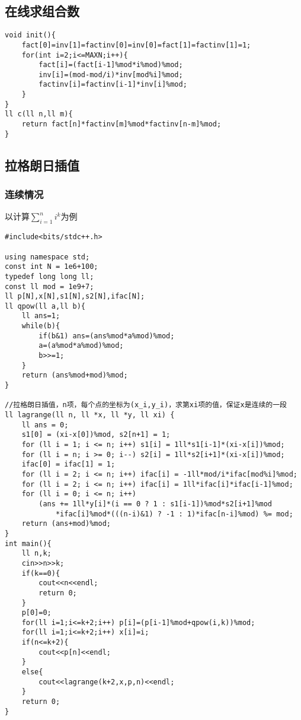 \documentclass[twocolumn,a4]{article}
\begin{document}
\subsection{在线求组合数}
\begin{lstlisting}
void init(){
    fact[0]=inv[1]=factinv[0]=inv[0]=fact[1]=factinv[1]=1;
    for(int i=2;i<=MAXN;i++){
        fact[i]=(fact[i-1]%mod*i%mod)%mod;
        inv[i]=(mod-mod/i)*inv[mod%i]%mod;
        factinv[i]=factinv[i-1]*inv[i]%mod;
    }
}
ll c(ll n,ll m){
    return fact[n]*factinv[m]%mod*factinv[n-m]%mod;
}
\end{lstlisting}
\subsection{拉格朗日插值}
\subsubsection{连续情况}
以计算$\sum_{i=1}^{n}{i^k}$为例
\begin{lstlisting}
#include<bits/stdc++.h>

using namespace std;
const int N = 1e6+100;
typedef long long ll;
const ll mod = 1e9+7;
ll p[N],x[N],s1[N],s2[N],ifac[N];
ll qpow(ll a,ll b){
	ll ans=1;
	while(b){
		if(b&1) ans=(ans%mod*a%mod)%mod;
		a=(a%mod*a%mod)%mod;
		b>>=1;
	}
	return (ans%mod+mod)%mod;
}

//拉格朗日插值，n项，每个点的坐标为(x_i,y_i)，求第xi项的值，保证x是连续的一段 
ll lagrange(ll n, ll *x, ll *y, ll xi) {
    ll ans = 0;
    s1[0] = (xi-x[0])%mod, s2[n+1] = 1;
    for (ll i = 1; i <= n; i++) s1[i] = 1ll*s1[i-1]*(xi-x[i])%mod;
    for (ll i = n; i >= 0; i--) s2[i] = 1ll*s2[i+1]*(xi-x[i])%mod;
    ifac[0] = ifac[1] = 1;
    for (ll i = 2; i <= n; i++) ifac[i] = -1ll*mod/i*ifac[mod%i]%mod;
    for (ll i = 2; i <= n; i++) ifac[i] = 1ll*ifac[i]*ifac[i-1]%mod;
    for (ll i = 0; i <= n; i++)
        (ans += 1ll*y[i]*(i == 0 ? 1 : s1[i-1])%mod*s2[i+1]%mod
            *ifac[i]%mod*(((n-i)&1) ? -1 : 1)*ifac[n-i]%mod) %= mod;
    return (ans+mod)%mod;
}
int main(){
	ll n,k;
	cin>>n>>k;
	if(k==0){
		cout<<n<<endl;
		return 0;
	}
	p[0]=0;
	for(ll i=1;i<=k+2;i++) p[i]=(p[i-1]%mod+qpow(i,k))%mod;
	for(ll i=1;i<=k+2;i++) x[i]=i;
	if(n<=k+2){
		cout<<p[n]<<endl;
	}
	else{
		cout<<lagrange(k+2,x,p,n)<<endl;
	}
	return 0;
}
\end{lstlisting}
\end{document}
